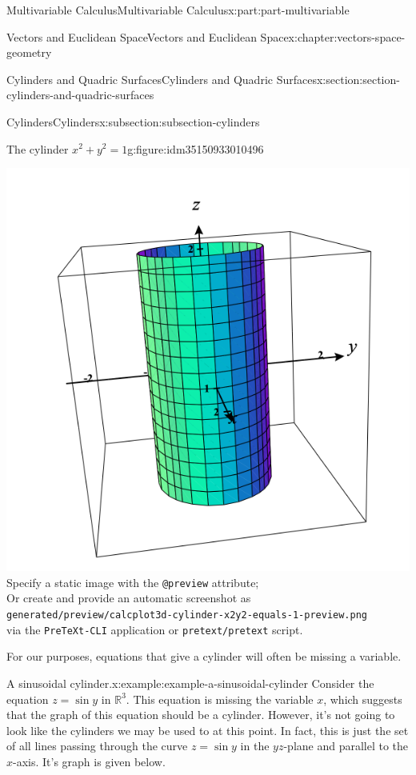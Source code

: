 \documentclass[twoside,10pt,]{book}
\newcommand{\mono}[1]{\texttt{#1}}
\numberwithin{equation}{part}
\newlength{\qrsize}
\newlength{\previewwidth}
\newcommand{\RR}{\mathbb{R}}
\begin{document}
\begin{partptx}{Multivariable Calculus}{}{Multivariable Calculus}{}{}{x:part:part-multivariable}
\begin{chapterptx}{Vectors and Euclidean Space}{}{Vectors and Euclidean Space}{}{}{x:chapter:vectors-space-geometry}
\begin{sectionptx}{Cylinders and Quadric Surfaces}{}{Cylinders and Quadric Surfaces}{}{}{x:section:section-cylinders-and-quadric-surfaces}
\begin{subsectionptx}{Cylinders}{}{Cylinders}{}{}{x:subsection:subsection-cylinders}
\begin{figureptx}{The cylinder \(x^2+y^2=1\)}{g:figure:idm35150933010496}{}
\begin{tcbraster}[raster columns=2, raster column skip=1pt, raster halign=center, raster force size=false, raster left skip=0pt, raster right skip=0pt]
\begin{tcolorbox}[previewstyle, width=\previewwidth]
{\includegraphics[width=0.80\linewidth,height=\qrsize,keepaspectratio]{generated/preview/calcplot3d-cylinder-x2y2-equals-1-preview.png}}%
{\small{}Specify a static image with the \mono{@preview} attribute;\\%
Or create and provide an automatic screenshot as\\%
\mono{generated/preview/calcplot3d-cylinder-x2y2-equals-1-preview.png}\\%
via the \mono{PreTeXt-CLI} application or \mono{pretext/pretext} script.}%
\end{tcolorbox}%
\begin{tcolorbox}[qrstyle]%
{\hypersetup{urlcolor=black}}%
\end{tcolorbox}%
\end{tcbraster}%
\tcblower
\end{figureptx}%
For our purposes, equations that give a cylinder will often be missing a variable.%
\begin{example}{A sinusoidal cylinder.}{x:example:example-a-sinusoidal-cylinder}%
Consider the equation \(z = \sin y\) in \(\RR^{3}\). This equation is missing the variable \(x\), which suggests that the graph of this equation should be a cylinder. However, it's not going to look like the cylinders we may be used to at this point. In fact, this is just the set of all lines passing through the curve \(z=\sin y\) in the \(yz\)-plane and parallel to the \(x\)-axis. It's graph is given below.%

\end{example}
\end{subsectionptx}
\end{sectionptx}
\end{chapterptx}
\end{partptx}
\end{document}

